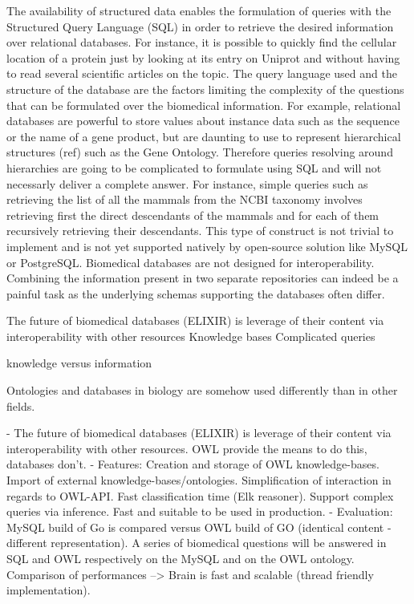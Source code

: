 \documentclass{bioinfo}
\begin{document}
The availability of structured data enables the formulation of queries with the Structured Query Language (SQL) in order to retrieve the desired 
information over relational databases. For instance, it is possible to
quickly find the cellular location of a protein just by looking at its entry on Uniprot and without having to read several scientific articles
on the topic. The query language used and the structure of the database are the factors limiting the complexity of the questions that can be 
formulated over the biomedical information. For example, relational databases are powerful to store values about instance data such as the
sequence or the name of a gene product, but are daunting to use to represent hierarchical structures (ref) such as the Gene Ontology. Therefore
queries resolving around hierarchies are going to be complicated to formulate using SQL and will not necessarly deliver a complete answer. For
instance, simple queries such as retrieving the list of all the mammals from the NCBI taxonomy involves retrieving first the direct descendants
of the mammals and for each of them recursively retrieving their descendants. This type of construct is not trivial to implement
and is not yet supported natively by open-source solution like MySQL or PostgreSQL.
Biomedical databases are not designed for interoperability. Combining the information present in
two separate repositories can indeed be a painful task as the underlying schemas supporting the databases often differ.


The future of biomedical databases (ELIXIR) is leverage of their content via interoperability with other resources
Knowledge bases
Complicated queries

knowledge versus information





Ontologies and databases in biology are somehow used differently than in other fields. 

- The future of biomedical databases (ELIXIR) is leverage of their content via interoperability with other resources.
OWL provide the means to do this, databases don't.
- Features: Creation and storage of OWL knowledge-bases. 
Import of external knowledge-bases/ontologies. 
Simplification of interaction in regards to OWL-API. Fast classification time (Elk reasoner). 
Support complex queries via inference. Fast and suitable to be used in production.
- Evaluation: MySQL build of Go is compared versus OWL build of GO (identical content - different representation).
A series of biomedical questions will be answered in SQL and OWL respectively on the MySQL and on the OWL ontology.
Comparison of performances --> Brain is fast and scalable (thread friendly implementation).
\end{document}
